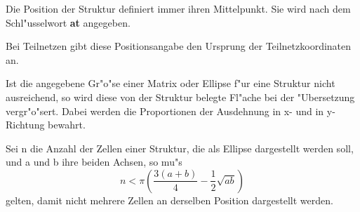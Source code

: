 \begin{center}
\end{center}

Die Position der
Struktur definiert
immer ihren Mittelpunkt. Sie wird nach dem Schl"usselwort {\bf
at} angegeben.

Bei Teilnetzen gibt diese Positionsangabe den Ursprung der Teilnetzkoordinaten an.

Ist die angegebene Gr"o"se einer Matrix oder Ellipse
f"ur eine Struktur nicht ausreichend, so wird diese
von der Struktur belegte Fl"ache bei der "Ubersetzung vergr"o"sert.
Dabei werden die Proportionen der Ausdehnung in x- und in y-Richtung
bewahrt.

Sei n die Anzahl der Zellen einer Struktur, die als Ellipse
dargestellt werden soll, und a und b ihre beiden Achsen, so mu"s $$n <
\pi(\frac{3(a + b)}{4} - \frac{1}{2}\sqrt{ab})$$ gelten, damit nicht
mehrere Zellen an derselben Position dargestellt werden.

